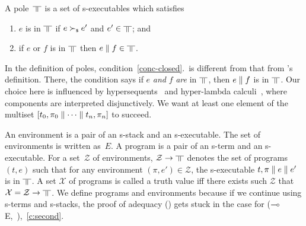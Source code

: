 \begin{definition}
 \label{def:pole}
A pole~$\bbot$ is a set of s-executables
which satisfies
\begin{enumerate}
 \item \label{red-closed} $e$ is in $\bbot$ if $e\succ_{\mathsf s} e'$ and
       $e'\in\bbot$; and
 \item \label{conc-closed} if $e$ or $f$ is in $\bbot$
       then $e\conc f\in\bbot$.
\end{enumerate}
\end{definition}
In the definition of poles,
condition~\ref{conc-closed}.~is different from that from \citet{danos-krivine}'s
definition.
There, the condition says if $e$ \textit{and} $f$ \textit{are} in
$\bbot$, then $e\parallel f$ is in $\bbot$.  Our choice here is influenced
by hypersequents~\citep{avron91} and hyper-lambda
calculi~\citep{hiraiflops2012},
where
components are interpreted disjunctively.
We want at least one element of the multiset
$[t_0,\pi_0\parallel \cdots \parallel t_n,\pi_n]$ to succeed.

An environment is a pair of an s-stack and an s-executable.
The set of environments is written as~$E$.
A program is a pair of an s-term and an s-executable.
For a set~$\mathcal Z$ of environments, $\mathcal Z\rightarrow\bbot$ denotes
the set of programs $(t,e)$ such that
for any environment $(\pi,e')\in \mathcal Z$,
the s-executable $t,\pi\parallel e \parallel e'$ is in $\bbot$.
A set $\mathcal X$ of programs is called a truth value
iff there exists
such $\mathcal Z$ that $\mathcal X = \mathcal Z\rightarrow \bbot$.
We define programs and environments because if we continue using
s-terms and s-stacks, the proof of adequacy () gets
stuck in the case for
($\multimap$E,~\textminus),~\ref{c:second}.

